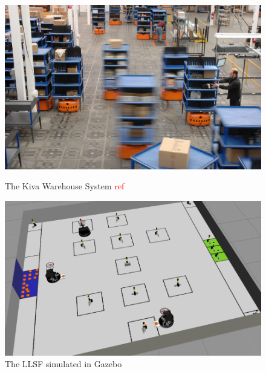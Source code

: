 \begin{figure}
\begin{minipage}[b]{0.5\linewidth}
\includegraphics[width=\textwidth]{pics/kiva}
\caption{The Kiva Warehouse System \textcolor{red}{ref}}
\label{fig:kiva}
\end{minipage}
\quad
\begin{minipage}[b]{0.5\linewidth}
\includegraphics[scale=0.45]{pics/sim_working}
\caption{The LLSF simulated in Gazebo}
\label{fig:intro_sim}
\end{minipage}
\end{figure}
